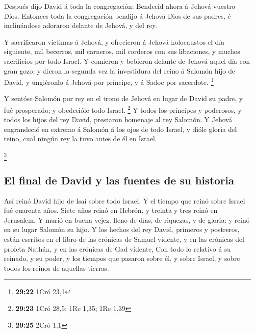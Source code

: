  Después dijo David á toda la congregación: Bendecid
ahora á Jehová vuestro Dios. Entonces toda la congregación bendijo á
Jehová Dios de sus padres, é inclinándose adoraron delante de Jehová, y
del rey.

 Y sacrificaron víctimas á Jehová, y ofrecieron á Jehová
holocaustos el día siguiente, mil becerros, mil carneros, mil corderos
con sus libaciones, y muchos sacrificios por todo Israel.
 Y comieron y bebieron delante de Jehová aquel día con
gran gozo; y dieron la segunda vez la investidura del reino á Salomón
hijo de David, y ungiéronlo á Jehová por príncipe, y á Sadoc por
sacerdote. \footnote{\textbf{29:22} 1Cró 23,1}

 Y sentóse Salomón por rey en el trono de Jehová en lugar
de David su padre, y fué prosperado; y obedecióle todo Israel.
\footnote{\textbf{29:23} 1Cró 28,5; 1Re 1,35; 1Re 1,39} 
Y todos los príncipes y poderosos, y todos los hijos del rey David,
prestaron homenaje al rey Salomón.  Y Jehová engrandeció
en extremo á Salomón á los ojos de todo Israel, y dióle gloria del
reino, cual ningún rey la tuvo antes de él en Israel.

\footnote{\textbf{29:25} 2Cró 1,1}

\hypertarget{el-final-de-david-y-las-fuentes-de-su-historia}{%
\subsection{El final de David y las fuentes de su
historia}\label{el-final-de-david-y-las-fuentes-de-su-historia}}

 Así reinó David hijo de Isaí sobre todo Israel.
 Y el tiempo que reinó sobre Israel fué cuarenta años.
Siete años reinó en Hebrón, y treinta y tres reinó en Jerusalem.
 Y murió en buena vejez, lleno de días, de riquezas, y de
gloria: y reinó en su lugar Salomón su hijo.  Y los
hechos del rey David, primeros y postreros, están escritos en el libro
de las crónicas de Samuel vidente, y en las crónicas del profeta Nathán,
y en las crónicas de Gad vidente,  Con todo lo relativo á
su reinado, y su poder, y los tiempos que pasaron sobre él, y sobre
Israel, y sobre todos los reinos de aquellas tierras.
